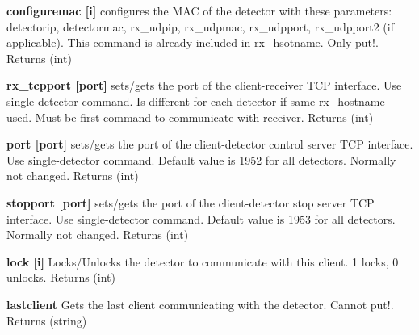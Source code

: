 \begin{DoxyItemize}
\item {\bfseries configuremac \mbox{[}i\mbox{]}} configures the MAC of the detector with these parameters: detectorip, detectormac, rx\_\-udpip, rx\_\-udpmac, rx\_\-udpport, rx\_\-udpport2 (if applicable). This command is already included in {\ttfamily rx\_\-hsotname}. Only put!. {\ttfamily Returns} {\ttfamily }(int)
\end{DoxyItemize}


\begin{DoxyItemize}
\item {\bfseries rx\_\-tcpport \mbox{[}port\mbox{]}} sets/gets the port of the client-\/receiver TCP interface. Use single-\/detector command. Is different for each detector if same {\ttfamily rx\_\-hostname} used. Must be first command to communicate with receiver. {\ttfamily Returns} {\ttfamily }(int)
\end{DoxyItemize}


\begin{DoxyItemize}
\item {\bfseries port \mbox{[}port\mbox{]}} sets/gets the port of the client-\/detector control server TCP interface. Use single-\/detector command. Default value is 1952 for all detectors. Normally not changed. {\ttfamily Returns} {\ttfamily }(int)
\end{DoxyItemize}


\begin{DoxyItemize}
\item {\bfseries stopport \mbox{[}port\mbox{]}} sets/gets the port of the client-\/detector stop server TCP interface. Use single-\/detector command. Default value is 1953 for all detectors. Normally not changed. {\ttfamily Returns} {\ttfamily }(int)
\end{DoxyItemize}


\begin{DoxyItemize}
\item {\bfseries lock \mbox{[}i\mbox{]}} Locks/Unlocks the detector to communicate with this client. 1 locks, 0 unlocks. {\ttfamily Returns} {\ttfamily }(int)
\end{DoxyItemize}


\begin{DoxyItemize}
\item {\bfseries lastclient } Gets the last client communicating with the detector. Cannot put!. {\ttfamily Returns} {\ttfamily }(string) 
\end{DoxyItemize}